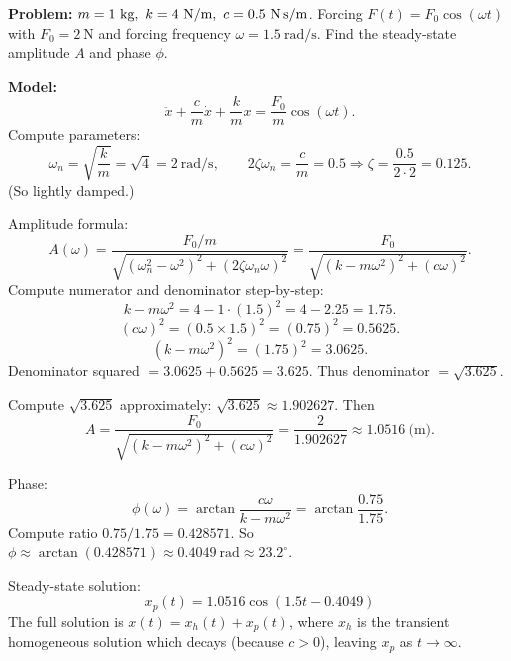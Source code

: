     \begin{example}
      \textbf{Problem:} \(m=1\ \text{kg},\ k=4\ \text{N/m},\ c=0.5\ \text{N\,s/m}\). Forcing \(F(t)=F_0\cos(\omega t)\) with \(F_0=2\ \text{N}\) and forcing frequency \(\omega=1.5\ \text{rad/s}\). Find the steady-state amplitude \(A\) and phase \(\phi\).

      \textbf{Model:}
      \[
      \ddot x + \frac{c}{m}\dot x + \frac{k}{m}x = \frac{F_0}{m}\cos(\omega t).
      \]
      Compute parameters:
      \[
      \omega_n=\sqrt{\frac{k}{m}}=\sqrt{4}=2\ \text{rad/s},\qquad
      2\zeta\omega_n=\frac{c}{m}=0.5 \Rightarrow \zeta=\frac{0.5}{2\cdot 2}=0.125.
      \]
      (So lightly damped.)

      Amplitude formula:
      \[
      A(\omega)=\frac{F_0/m}{\sqrt{(\omega_n^2-\omega^2)^2 + (2\zeta\omega_n\omega)^2}}
      =\frac{F_0}{\sqrt{(k-m\omega^2)^2 + (c\omega)^2}}.
      \]
      Compute numerator and denominator step-by-step:
      \[
      k - m\omega^2 = 4 - 1\cdot(1.5)^2 = 4 - 2.25 = 1.75.
      \]
      \[
      (c\omega)^2 = (0.5\times 1.5)^2 = (0.75)^2 = 0.5625.
      \]
      \[
      (k-m\omega^2)^2 = (1.75)^2 = 3.0625.
      \]
      Denominator squared \(= 3.0625 + 0.5625 = 3.625.\) Thus denominator \(=\sqrt{3.625}\).

      Compute \(\sqrt{3.625}\) approximately: \(\sqrt{3.625}\approx 1.902627\). Then
      \[
      A = \frac{F_0}{\sqrt{(k-m\omega^2)^2 + (c\omega)^2}} = \frac{2}{1.902627} \approx 1.0516\ \text{(m)}.
      \]

      Phase:
      \[
      \phi(\omega) = \arctan\!\frac{c\omega}{k-m\omega^2} = \arctan\!\frac{0.75}{1.75}.
      \]
      Compute ratio \(0.75/1.75 = 0.428571\). So \(\phi\approx\arctan(0.428571)\approx 0.4049\ \text{rad}\approx 23.2^\circ\).

      Steady-state solution:
      \[
      \boxed{\,x_p(t)=1.0516\cos(1.5t - 0.4049)\,}
      \]
      The full solution is \(x(t)=x_h(t)+x_p(t)\), where \(x_h\) is the transient homogeneous solution which decays (because \(c>0\)), leaving \(x_p\) as \(t\to\infty\).
    \end{example}


